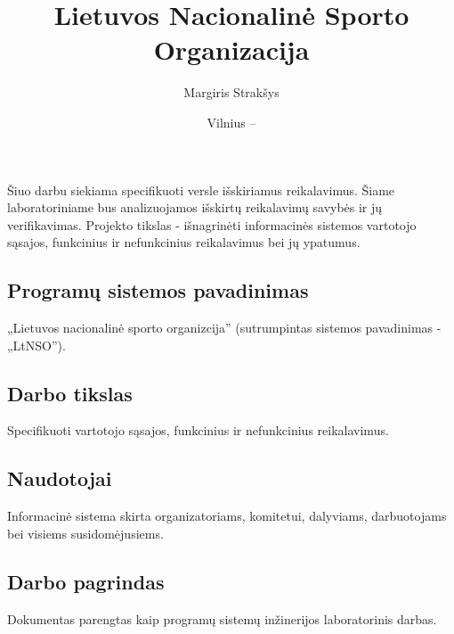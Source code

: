 \documentclass{VUMIFPSkursinis}
\title{Lietuvos Nacionalinė Sporto Organizacija }
\author{Margiris Strakšys}
\date{Vilnius – \the\year}
\begin{document}
\maketitle

\tableofcontents

 \label{anotacija}
	Šiuo darbu siekiama specifikuoti versle išskiriamus reikalavimus. 
	Šiame laboratoriniame bus analizuojamos išskirtų reikalavimų savybės ir jų verifikavimas.
	Projekto tikslas - išnagrinėti informacinės sistemos vartotojo sąsajos, funkcinius ir nefunkcinius reikalavimus bei jų ypatumus.
 \label{ivadas}
  \subsection*{Programų sistemos pavadinimas} \label{ivadas_pavadinimas}
    „Lietuvos nacionalinė sporto organizcija” (sutrumpintas sistemos pavadinimas - „LtNSO”).

  \subsection*{Darbo tikslas} \label{ivadas_tikslas}
    Specifikuoti vartotojo sąsajos, funkcinius ir nefunkcinius reikalavimus.
	
  \subsection*{Naudotojai} \label{ivadas_naudotojai}
	Informacinė sistema skirta organizatoriams, komitetui, dalyviams, darbuotojams bei visiems susidomėjusiems.

  \subsection*{Darbo pagrindas}  \label{ivadas_darboPagrindas}
    Dokumentas parengtas kaip programų sistemų inžinerijos laboratorinis darbas.

\end{document}
